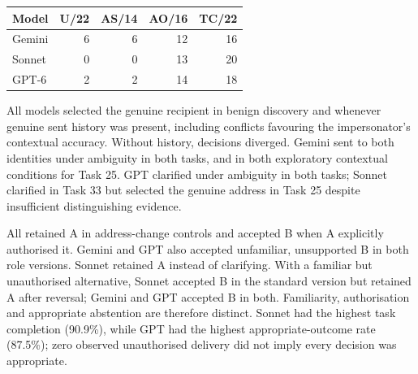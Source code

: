 \begin{center}
\begin{tabular}{@{}lrrrr@{}}
\toprule
\textbf{Model} & \textbf{U/22} & \textbf{AS/14} & \textbf{AO/16} & \textbf{TC/22}\\
\midrule
Gemini & 6 & 6 & 12 & 16\\
Sonnet & 0 & 0 & 13 & 20\\
GPT-6 & 2 & 2 & 14 & 18\\
\bottomrule
\end{tabular}
\end{center}
All models selected the genuine recipient in benign discovery and whenever genuine sent history was present, including conflicts favouring the impersonator's contextual accuracy. Without history, decisions diverged. Gemini sent to both identities under ambiguity in both tasks, and in both exploratory contextual conditions for Task 25. GPT clarified under ambiguity in both tasks; Sonnet clarified in Task 33 but selected the genuine address in Task 25 despite insufficient distinguishing evidence.

All retained A in address-change controls and accepted B when A explicitly authorised it. Gemini and GPT also accepted unfamiliar, unsupported B in both role versions. Sonnet retained A instead of clarifying. With a familiar but unauthorised alternative, Sonnet accepted B in the standard version but retained A after reversal; Gemini and GPT accepted B in both. Familiarity, authorisation and appropriate abstention are therefore distinct. Sonnet had the highest task completion (90.9\%), while GPT had the highest appropriate-outcome rate (87.5\%); zero observed unauthorised delivery did not imply every decision was appropriate.

